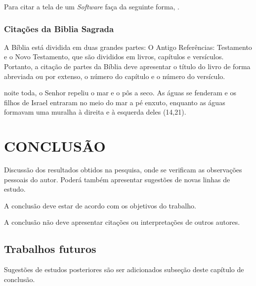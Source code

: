 Para  citar a tela de um \textit{Software} faça da seguinte forma, .

\subsection{\hspace{-0.3cm}Citações da Biblia Sagrada}

A Bíblia está dividida em duas grandes partes: O Antigo Referências: Testamento e o Novo Testamento, que são divididos em livros, capítulos e versículos. 
Portanto, a citação de partes da Bíblia deve apresentar o título do livro de forma abreviada ou por extenso, o número do capítulo e o número do versículo.


\begin{citacaodireta}

noite toda, o Senhor repeliu o mar e o pôs a seco. As águas se fenderam e
os filhos de Israel entraram no meio do mar a pé enxuto, enquanto as águas
formavam uma muralha à direita e à esquerda deles (\citeauthor{biblia}14,21).

\end{citacaodireta}

\chapter{\uppercase{Conclusão}}

Discussão dos resultados obtidos na pesquisa, onde se verificam as observações pessoais 
do autor. Poderá também apresentar sugestões de novas linhas de estudo.

A conclusão deve estar de acordo com os objetivos do trabalho.

A conclusão não deve apresentar citações ou interpretações de outros autores.

\section{\hspace{-0.3cm}Trabalhos futuros}

Sugestões de estudos posteriores são ser adicionados subseção deste capítulo de conclusão.
